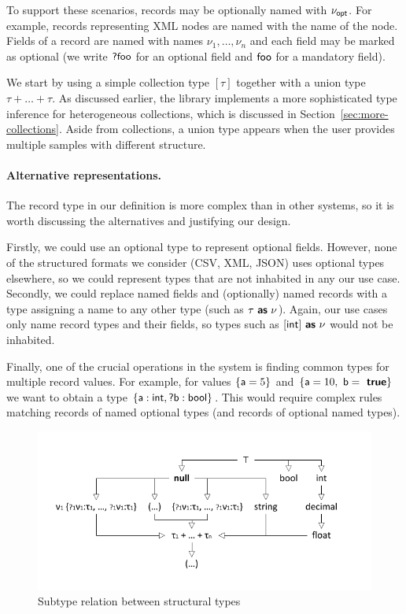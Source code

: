 \documentclass[10pt]{sigplanconf}
\newcommand{\todo}[1]{\marginpar{\color{red}{\footnotesize \begin{spacing}{0.9} #1 \end{spacing}}}}
\newcommand{\kvd}[1]{\textbf{\sffamily #1}}
\newcommand{\ident}[1]{\textnormal{\sffamily #1}}
\begin{document}
To support these scenarios, records may be optionally named with $\nu_{\ident{opt}}$. For example,
records representing XML nodes are named with the name of the node. Fields of a record
are named with names $\nu_1, \ldots, \nu_n$ and each field may be marked as optional (we write 
$\ident{?foo}$ for an optional field and $\ident{foo}$ for a mandatory field).

We start by using a simple collection type $[\tau]$ together with a union type $\tau + \ldots + \tau$.
As discussed earlier, the library implements a more sophisticated type inference for heterogeneous
collections, which is discussed in Section~\ref{sec:more-collections}. Aside from collections, a 
union type appears when the user provides multiple samples with different structure.

\paragraph{Alternative representations.}
The record type in our definition is more complex than in other systems, so it is worth discussing 
the alternatives and justifying our design.\todo{Ref. some ``other system'' here?}

Firstly, we could use an optional type to represent optional fields. However, none of the structured
formats we consider (CSV, XML, JSON) uses optional types elsewhere, so we could represent types that
are not inhabited in any our use case. Secondly, we could replace named fields and (optionally) named
records with a type assigning a name to any other type (such as $\tau~\kvd{as}~\nu$). Again, our use
cases only name record types and their fields, so types such as $[\ident{int}]~\kvd{as}~\nu$ would not
be inhabited.

Finally, one of the crucial operations in the system is finding common types for multiple record values.
For example, for values $\{ \ident{a} = 5 \}$ and $\{ \ident{a} = 10, \ident{b} = \kvd{true} \}$
we want to obtain a type $\{ \ident{a} : \ident{int}, \ident{?b} : \ident{bool} \}$. This would require
complex rules matching records of named optional types (and records of optional named types).

\begin{figure}
\begin{center}
\includegraphics[scale=0.85,trim=10mm 4mm 12mm 9mm,clip]{images/hierarchy.pdf} %
\end{center}
\vspace{-1em}
\caption{Subtype relation between structural types}
\label{fig:subtyping-diagram}
\end{figure}
\end{document}
